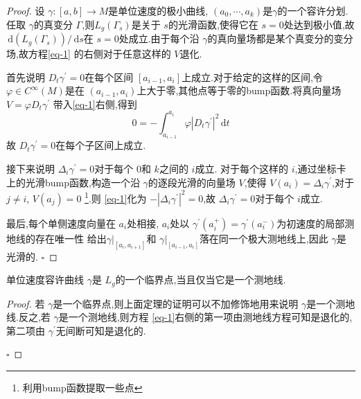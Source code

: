 \documentclass[../../几何与拓扑.tex]{subfiles}
\begin{document}
\begin{proof}
    设 \(   \gamma :\left[ a,b \right]\to M   \)是单位速度的极小曲线, \(  \left(  a_0,\cdots,a_{k}    \right)   \)是\(   \gamma   \)的一个容许分划.任取 \(   \gamma   \)的真变分 \(   \Gamma   \),则\(  L_{g}\left(  \Gamma _{s} \right)   \)是关于 \(  s  \)的光滑函数,使得它在 \(  s= 0  \)处达到极小值,故 \(  \,\mathrm{d} \left( L_{g}\left(  \Gamma _{s} \right)  \right)/ \,\mathrm{d} s   \)在 \(  s= 0  \)处成立.由于每个沿 \(   \gamma   \)的真向量场都是某个真变分的变分场,故方程\ref{eq-1} 的右侧对于任意这样的 \(  V  \)退化.
    
    首先说明 \(  D_{t} \gamma ^{\prime} = 0  \)在每个区间 \(  \left[ a_{i-1},a_{i} \right]   \)上成立.对于给定的这样的区间,令 \(   \varphi \in C^{\infty}\left( M \right)   \)是在 \(  \left( a_{i-1},a_{i} \right)   \)上大于零,其他点等于零的bump函数.将真向量场 \(  V =   \varphi D_{t} \gamma ^{\prime}   \) 带入\ref{eq-1}右侧,得到 \[
    0=  -\int_{a_{i-1}}^{a_{i}} \varphi \left| D_{t} \gamma ^{\prime}  \right|^{2}\,\mathrm{d} t 
    \]    故 \(  D_{t} \gamma ^{\prime} = 0  \)在每个子区间上成立. 


    接下来说明 \(   \Delta _{i} \gamma ^{\prime} = 0  \)对于每个 \(  0  \)和 \(  k  \)之间的 \(  i  \)成立.   对于每个这样的 \(  i  \),通过坐标卡上的光滑bump函数,构造一个沿 \(   \gamma   \)的逐段光滑的向量场 \(  V  \),使得 \(  V\left( a_{i} \right)=  \Delta _{i} \gamma ^{\prime}    \),对于 \(  j\neq i  \),  \(  V\left( a_{j} \right)= 0  \)     \footnote{利用bump函数提取一些点}.则 \ref{eq-1}化为 \(  -\left|  \Delta _{i} \gamma ^{\prime}  \right|^{2}= 0   \),故 \(   \Delta _{i} \gamma ^{\prime} = 0  \)对于每个 \(  i  \)成立.   

    最后,每个单侧速度向量在 \(  a_{i}  \)处相接,  \(  a_{i}  \)处以 \(   \gamma ^{\prime} \left( a_{i}^{+ } \right)=  \gamma ^{\prime} \left( a_{i}^{-} \right)    \)为初速度的局部测地线的存在唯一性  给出\(   \gamma |_{\left[ a_{i},a_{i+ 1} \right] }  \)和 \(   \gamma |_{\left[ a_{i-1},a_{i} \right] }  \)落在同一个极大测地线上,因此 \(   \gamma   \)是光滑的.   
    \hfill $\square$
\end{proof}

\begin{corollary}
    单位速度容许曲线 \(   \gamma   \)是 \(  L_{g}  \)的一个临界点,当且仅当它是一个测地线.  
\end{corollary}
\begin{proof}
    若 \(   \gamma   \)是一个临界点,则上面定理的证明可以不加修饰地用来说明 \(   \gamma   \)是一个测地线.反之,若 \(   \gamma   \)是一个测地线,则方程 \ref{eq-1}右侧的第一项由测地线方程可知是退化的,第二项由 \(   \gamma ^{\prime}   \)无间断可知是退化的.    

    \hfill $\square$
\end{proof}
\end{document}
